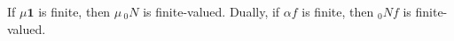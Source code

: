 If $\mu \mathbf{1}$ is finite, then $\mu \, {}_0 N$ is finite-valued. Dually, if $\alpha f$ is finite, then ${}_0 N f$ is finite-valued.
